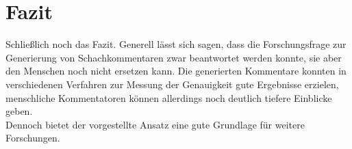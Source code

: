 \section{Fazit}

Schließlich noch das Fazit. Generell lässt sich sagen, dass die Forschungsfrage zur Generierung von Schachkommentaren zwar beantwortet werden konnte, sie aber den Menschen noch nicht ersetzen kann. Die generierten Kommentare konnten in verschiedenen Verfahren zur Messung der Genauigkeit gute Ergebnisse erzielen, menschliche Kommentatoren können allerdings noch deutlich tiefere Einblicke geben.\\

Dennoch bietet der vorgestellte Ansatz eine gute Grundlage für weitere Forschungen.